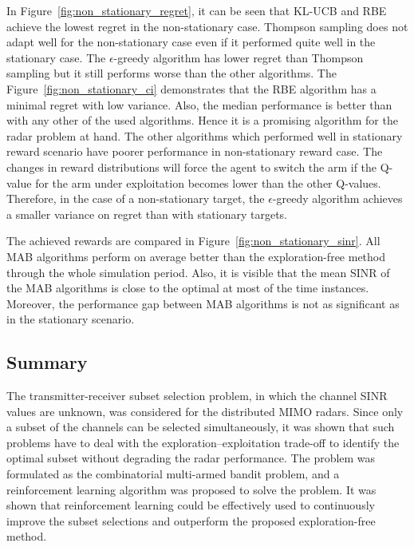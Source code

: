 \documentclass[english, 12pt, a4paper, elec, utf8, a-1b, online]{aaltothesis}
\numberwithin{equation}{section}
\begin{document}
In Figure~\ref{fig:non_stationary_regret}, it can be seen that KL-UCB and RBE achieve the lowest regret in the non-stationary case.
Thompson sampling does not adapt well for the non-stationary case even if it performed quite well in the stationary case.
The $\epsilon$-greedy algorithm has lower regret than Thompson sampling but it still performs worse than the other algorithms. 
The Figure~\ref{fig:non_stationary_ci} demonstrates that the RBE algorithm has a minimal regret with low variance.
Also, the median performance is better than with any other of the used algorithms.
Hence it is a promising algorithm for the radar problem at hand. 
The other algorithms which performed well in stationary reward scenario have poorer performance in non-stationary reward case.
The changes in reward distributions will force the agent to switch the arm if the Q-value for the arm under exploitation becomes lower than the other Q-values.
Therefore, in the case of a non-stationary target, the $\epsilon$-greedy algorithm achieves a smaller variance on regret than with stationary targets.

The achieved rewards are compared in Figure~\ref{fig:non_stationary_sinr}.
All MAB algorithms perform on average better than the exploration-free method through the whole simulation period.
Also, it is visible that the mean SINR of the MAB algorithms is close to the optimal at most of the time instances. 
Moreover, the performance gap between MAB algorithms is not as significant as in the stationary scenario.

\subsection{Summary}
\label{sec:tx_rx_summary}

The transmitter-receiver subset selection problem, in which the channel SINR values are unknown, was considered for the distributed MIMO radars.
Since only a subset of the channels can be selected simultaneously, it was shown that such problems have to deal with the exploration--exploitation trade-off to identify the optimal subset without degrading the radar performance.
The problem was formulated as the combinatorial multi-armed bandit problem, and a reinforcement learning algorithm was proposed to solve the problem.
It was shown that reinforcement learning could be effectively used to continuously improve the subset selections and outperform the proposed exploration-free method.
\end{document}
